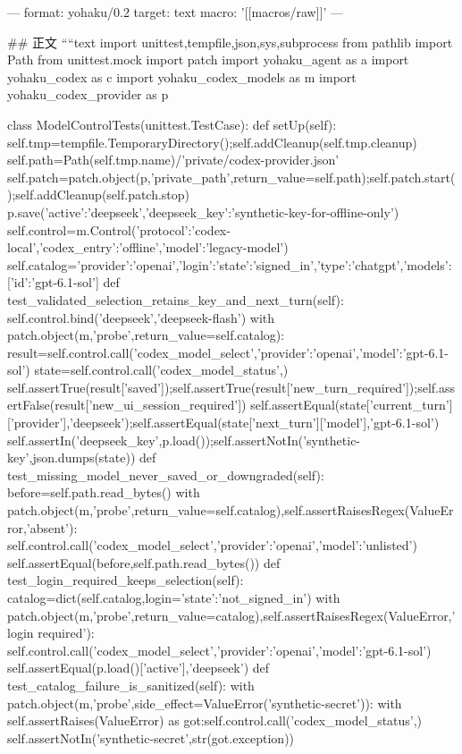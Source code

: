 ---
format: yohaku/0.2
target: text
macro: '[[macros/raw]]'
---

## 正文
````text
import unittest,tempfile,json,sys,subprocess
from pathlib import Path
from unittest.mock import patch
import yohaku_agent as a
import yohaku_codex as c
import yohaku_codex_models as m
import yohaku_codex_provider as p

class ModelControlTests(unittest.TestCase):
 def setUp(self):
  self.tmp=tempfile.TemporaryDirectory();self.addCleanup(self.tmp.cleanup)
  self.path=Path(self.tmp.name)/'private/codex-provider.json'
  self.patch=patch.object(p,'private_path',return_value=self.path);self.patch.start();self.addCleanup(self.patch.stop)
  p.save({'active':'deepseek','deepseek_key':'synthetic-key-for-offline-only'})
  self.control=m.Control({'protocol':'codex-local','codex_entry':'offline','model':'legacy-model'})
  self.catalog={'provider':'openai','login':{'state':'signed_in','type':'chatgpt'},'models':[{'id':'gpt-6.1-sol'}]}
 def test_validated_selection_retains_key_and_next_turn(self):
  self.control.bind('deepseek','deepseek-flash')
  with patch.object(m,'probe',return_value=self.catalog):
   result=self.control.call('codex_model_select',{'provider':'openai','model':'gpt-6.1-sol'})
   state=self.control.call('codex_model_status',{})
  self.assertTrue(result['saved']);self.assertTrue(result['new_turn_required']);self.assertFalse(result['new_ui_session_required'])
  self.assertEqual(state['current_turn']['provider'],'deepseek');self.assertEqual(state['next_turn']['model'],'gpt-6.1-sol')
  self.assertIn('deepseek_key',p.load());self.assertNotIn('synthetic-key',json.dumps(state))
 def test_missing_model_never_saved_or_downgraded(self):
  before=self.path.read_bytes()
  with patch.object(m,'probe',return_value=self.catalog),self.assertRaisesRegex(ValueError,'absent'):
   self.control.call('codex_model_select',{'provider':'openai','model':'unlisted'})
  self.assertEqual(before,self.path.read_bytes())
 def test_login_required_keeps_selection(self):
  catalog=dict(self.catalog,login={'state':'not_signed_in'})
  with patch.object(m,'probe',return_value=catalog),self.assertRaisesRegex(ValueError,'login required'):
   self.control.call('codex_model_select',{'provider':'openai','model':'gpt-6.1-sol'})
  self.assertEqual(p.load()['active'],'deepseek')
 def test_catalog_failure_is_sanitized(self):
  with patch.object(m,'probe',side_effect=ValueError('synthetic-secret')):
   with self.assertRaises(ValueError) as got:self.control.call('codex_model_status',{})
  self.assertNotIn('synthetic-secret',str(got.exception))
